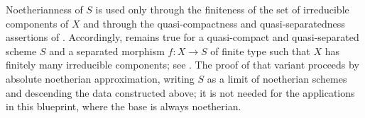 \begin{remark}\label{rem:chow-lemma-non-noetherian}
Noetherianness of $S$ is used only through the finiteness of the set of
irreducible components of $X$ and through the quasi-compactness and
quasi-separatedness assertions of .  Accordingly,
 remains true for a quasi-compact and quasi-separated
scheme $S$ and a separated morphism $f\colon X\to S$ of finite type such that
$X$ has finitely many irreducible components; see .  The
proof of that variant proceeds by absolute noetherian approximation, writing
$S$ as a limit of noetherian schemes and descending the data constructed
above; it is not needed for the applications in this blueprint, where the base
is always noetherian.
\end{remark}
